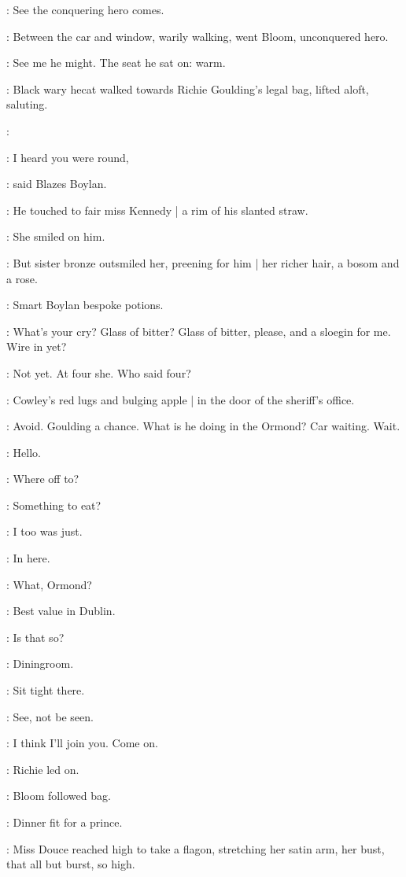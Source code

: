 \lenehan:
See the conquering hero comes.

:
Between the car and window,
warily walking,
went Bloom,
unconquered hero.

\BloomInt:
See me he might.
The seat he sat on:
warm.

:
Black wary hecat walked towards Richie Goulding's legal bag,
lifted aloft,
saluting.

\simon:

\boylan:
I heard you were round,

:
said Blazes Boylan.

:
He touched to fair miss Kennedy |
a rim of his slanted straw.

:
She smiled on him.

:
But sister bronze outsmiled her,
preening for him |
her richer hair,
a bosom
and a rose.

:
Smart Boylan bespoke potions.

\boylan:
What's your cry?
Glass of bitter?
Glass of bitter, please,
and a sloegin for me.
Wire in yet?

\BloomInt:
Not yet.
At four she.
Who said four?

:
Cowley's red lugs and bulging apple |
in the door of the sheriff's office.

\BloomInt:
Avoid.
Goulding a chance.
What is he doing in the Ormond?
Car waiting.
Wait.

\Bloom:
Hello.

\goulding:
Where off to?

\Bloom:
Something to eat?

\goulding:
I too was just.

\Bloom:
In here.

\goulding:
What,
Ormond?

\Bloom:
Best value in Dublin.

\goulding:
Is that so?

\Bloom:
Diningroom.

\Bloom:
Sit tight there.

\BloomInt:
See,
not be seen.

\goulding:
I think I'll join you.
Come on.

:
Richie led on.

:
Bloom followed bag.

\BloomInt:
Dinner fit for a prince.

:
Miss Douce reached high to take a flagon,
stretching her satin arm,
her bust,
that all but burst,
so high.

